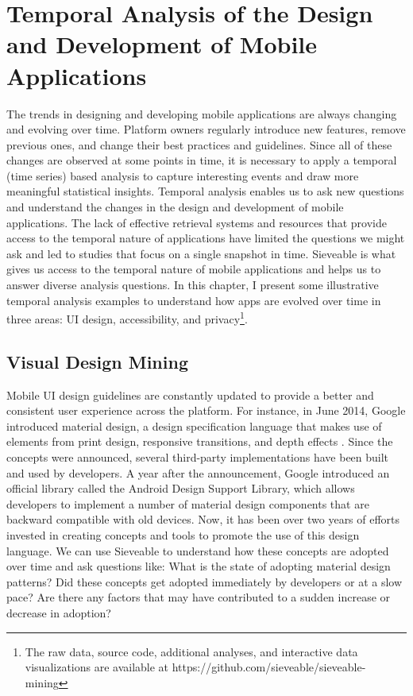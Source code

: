 \chapter{Temporal Analysis of the Design and Development of Mobile Applications}
\label{ch:findings_chapter}
The trends in designing and developing mobile applications are always changing and evolving over time.
Platform owners regularly introduce new features, remove previous ones, and change their best practices and guidelines.
Since all of these changes are observed at some points in time, it is necessary to apply a temporal (time series) based analysis to capture interesting events and draw more meaningful statistical insights.
Temporal analysis enables us to ask new questions and understand the changes in the design and development of mobile applications.
The lack of effective retrieval systems and resources that provide access to the temporal nature of applications have limited the questions we might ask and led to studies that focus on a single snapshot in time.
Sieveable is what gives us access to the temporal nature of mobile applications and helps us to answer diverse analysis questions.
In this chapter, I present some illustrative temporal analysis examples to understand how apps are evolved over time in three areas: UI design, accessibility, and privacy\footnote{The raw data, source code, additional analyses, and interactive data visualizations are available at https://github.com/sieveable/sieveable-mining}.

\section{Visual Design Mining}

Mobile UI design guidelines are constantly updated to provide a better and consistent user experience across the platform.
For instance, in June 2014, Google introduced material design, a design specification language that makes use of elements from print design, responsive transitions, and depth effects \cite{Google_Material_Design}.
Since the concepts were announced, several third-party implementations have been built and used by developers.
A year after the announcement, Google introduced an official library called the Android Design Support Library, which allows developers to implement a number of material design components that are backward compatible with old devices.
Now, it has been over two years of efforts invested in creating concepts and tools to promote the use of this design language.
We can use Sieveable to understand how these concepts are adopted over time and ask questions like:
What is the state of adopting material design patterns?
Did these concepts get adopted immediately by developers or at a slow pace?
Are there any factors that may have contributed to a sudden increase or decrease in adoption?


